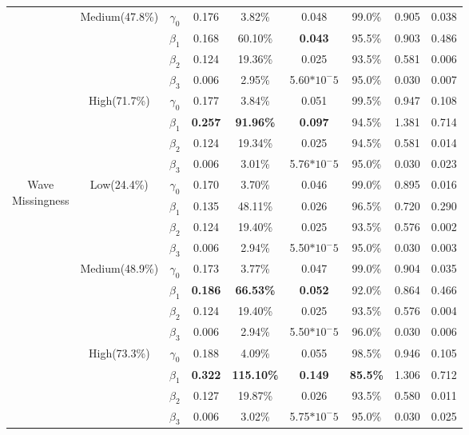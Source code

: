 \documentclass{svjour3}\usepackage[]{graphicx}\usepackage[]{color}
\begin{document}
\begin{table}[p]
\begin{tabular}{c|c|c|cccccc}
		&\multirow{4}{*}{Medium(47.8\%)}
		& $\gamma_0$ & 0.176 & 3.82\% & 0.048 & 99.0\% & 0.905 & 0.038 \\
		&& $\beta_1$ & 0.168 & 60.10\% & \textbf{0.043} & 95.5\% & 0.903 & 0.486 \\
		&& $\beta_2$ & 0.124 & 19.36\% & 0.025 & 93.5\% & 0.581 & 0.006 \\
		&& $\beta_3$ & 0.006 & 2.95\% & 5.60$*10^-5$ & 95.0\% & 0.030 & 0.007 \\ \cline{2-9} \noalign{\smallskip}
		& \multirow{4}{*}{High(71.7\%)}
		& $\gamma_0$ & 0.177 & 3.84\% & 0.051 & 99.5\% & 0.947 & 0.108 \\
		&& $\beta_1$ & \textbf{0.257} & \textbf{91.96\%} & \textbf{0.097} & 94.5\% & 1.381 & 0.714 \\
		&& $\beta_2$ & 0.124 & 19.34\% & 0.025 & 94.5\% & 0.581 & 0.014 \\
		&& $\beta_3$ & 0.006 & 3.01\% & 5.76$*10^-5$ & 95.0\% & 0.030 & 0.023 \\
		\midrule
		\midrule
		\multirow{12}{*}{\parbox{1.75cm}{Wave \\ Missingness}}
		& \multirow{4}{*}{Low(24.4\%)}
		& $\gamma_0$ & 0.170 & 3.70\% & 0.046 & 99.0\% & 0.895 & 0.016 \\
		&& $\beta_1$ & 0.135 & 48.11\% & 0.026 & 96.5\% & 0.720 & 0.290 \\
		&& $\beta_2$ & 0.124 & 19.40\% & 0.025 & 93.5\% & 0.576 & 0.002 \\
		&& $\beta_3$ & 0.006 & 2.94\% & 5.50$*10^-5$ & 95.0\% & 0.030 & 0.003 \\ \cline{2-9} \noalign{\smallskip}
		&\multirow{4}{*}{Medium(48.9\%)}
		& $\gamma_0$ & 0.173 & 3.77\% & 0.047 & 99.0\% & 0.904 & 0.035 \\
		&& $\beta_1$ & \textbf{0.186} & \textbf{66.53\%} & \textbf{0.052} & 92.0\% & 0.864 & 0.466 \\
		&& $\beta_2$ & 0.124 & 19.40\% & 0.025 & 93.5\% & 0.576 & 0.004 \\
		&& $\beta_3$ & 0.006 & 2.94\% & 5.50$*10^-5$ & 96.0\% & 0.030 & 0.006 \\ \cline{2-9} \noalign{\smallskip}
		& \multirow{4}{*}{High(73.3\%)}
		& $\gamma_0$ & 0.188 & 4.09\% & 0.055 & 98.5\% & 0.946 & 0.105 \\
		&& $\beta_1$ & \textbf{0.322} & \textbf{115.10\%} & \textbf{0.149} & \textbf{85.5\%} & 1.306 & 0.712 \\
		&& $\beta_2$ & 0.127 & 19.87\% & 0.026 & 93.5\% & 0.580 & 0.011 \\
		&& $\beta_3$ & 0.006 & 3.02\% & 5.75$*10^-5$ & 95.0\% & 0.030 & 0.025 \\
		\bottomrule
	\end{tabular}
\end{table}
\end{document}

